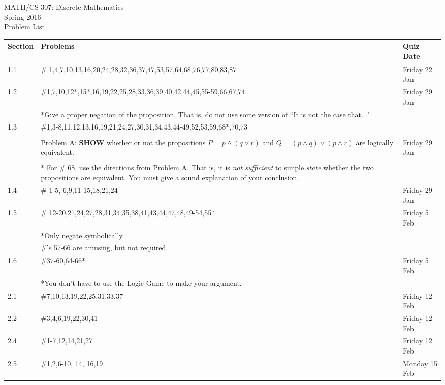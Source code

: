 \documentclass[11pt]{article}
\begin{document}
\begin{center}MATH/CS 307:  Discrete Mathematics \\ Spring 2016 \\ Problem List\end{center}

\hrulefill

\begin{tabular}{|p{1.6cm}|p{12cm}|p{3cm}|}
\hline
Section & Problems & Quiz Date\\
\hline \hline
1.1 & \# 1,4,7,10,13,16,20,24,28,32,36,37,47,53,57,64,68,76,77,80,83,87& Friday 22 Jan \\
\hline
1.2 & \#1,7,10,12*,15*,16,19,22,25,28,33,36,39,40,42,44,45,55-59,66,67,74 & Friday 29 Jan \\
&*Give a proper negation of the proposition. That is, do not use some version of ``It is not the case that..."&\\
\hline
1.3 & \#1,3-8,11,12,13,16,19,21,24,27,30,31,34,43,44-49,52,53,59,68*,70,73&\\
&&\\
& \underline{Problem A}: \textbf{SHOW} whether or not the propositions $P=p \wedge(q\vee r)$ and $Q=(p \wedge q) \vee (p \wedge r)$ are logically equivalent.&Friday 29 Jan\\
&&\\
& * For \# 68, use the directions from Problem A. That is, it is \emph{not sufficient} to simple \emph{state} whether the two propositions are equivalent. You must give a sound explanation of your conclusion.&\\
\hline
1.4 & \# 1-5, 6,9,11-15,18,21,24& Friday 29 Jan\\
\hline
1.5 & \# 12-20,21,24,27,28,31,34,35,38,41,43,44,47,48,49-54,55*&Friday 5 Feb\\
& *Only negate symbolically. &\\
& \#'s 57-66 are amusing, but not required. & \\
\hline
1.6 & \#37-60,64-66*&Friday 5 Feb\\
&*You don't have to use the Logic Game to make your argument.&\\
\hline
2.1 & \#7,10,13,19,22,25,31,33,37& Friday 12 Feb \\
\hline
2.2 & \#3,4,6,19,22,30,41& Friday 12 Feb\\
\hline
2.4 & \#1-7,12,14,21,27& Friday 12 Feb\\
\hline
2.5 & \#1,2,6-10, 14, 16,19& Monday 15 Feb\\
\hline
\end{tabular}
\end{document}
